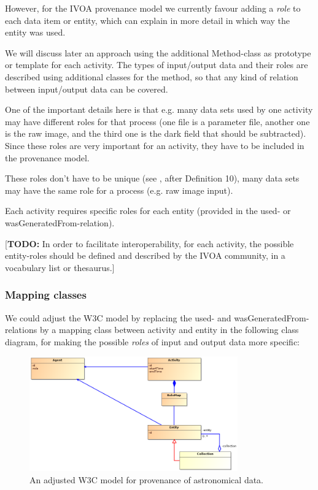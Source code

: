 \documentclass[11pt,a4paper]{ivoa}
\newcommand{\TODO}[1]{\noindent \textcolor{todocolor}{[\textbf{TODO:} #1]}}
\begin{document}
However, for the IVOA provenance model we currently favour adding a \emph{role} to each data item or entity, which can explain in more detail in which way the entity was used.

We will discuss later an approach using the additional Method-class as prototype or template for each activity.
The types of input/output data and their roles are described using additional classes for the method, so that any kind of relation between input/output data can be covered.

One of the important details here is that e.g. many data sets used by one activity may have different roles for that process (one file is a parameter file, another one is the raw image, and the third one is the dark field that should be subtracted). Since these roles are very important for an activity, they have to be included in the provenance model.

These roles don't have to be unique (see \cite{moreau2010}, after Definition 10), many data sets may have the same role for a process (e.g. raw image input).

Each activity requires specific roles for each entity (provided in the used- or wasGeneratedFrom-relation). 

\TODO{In order to facilitate interoperability, for each activity, the possible entity-roles should be defined and described by the IVOA community, in a vocabulary list or thesaurus.}


\subsubsection{Mapping classes}
We could adjust the W3C model by 
replacing the used- and wasGeneratedFrom-relations by a mapping class between activity and entity in the following class diagram, for making the possible \emph{roles} of input and output data more specific:

\begin{figure}
\centering
\includegraphics[width=0.8\textwidth]{ProvDM-W3C-adjusted.png}
\caption{An adjusted W3C model for provenance of astronomical data.}
\label{fig:classes-w3c-adjusted}
\end{figure}
\end{document}
